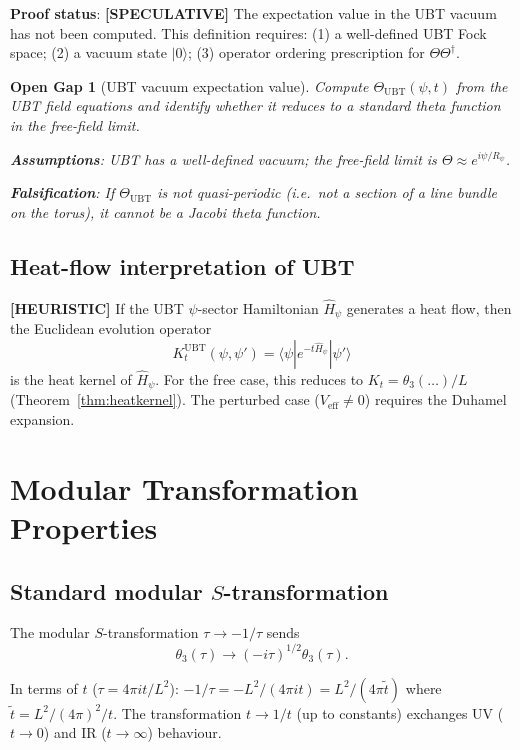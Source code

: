 \documentclass[11pt,a4paper]{article}
\newtheorem{gap}{Open Gap}
\newcommand{\heuristic}[1]{\textbf{[HEURISTIC]} #1}
\newcommand{\speculative}[1]{\textbf{[SPECULATIVE]} #1}
\begin{document}
\textbf{Proof status}: \speculative{The expectation value in the UBT vacuum
has not been computed.  This definition requires:
(1) a well-defined UBT Fock space;
(2) a vacuum state $|0\rangle$;
(3) operator ordering prescription for $\Theta\Theta^\dagger$.}

\begin{gap}[UBT vacuum expectation value]
  \label{gap:vev}
  Compute $\Theta_\mathrm{UBT}(\psi, t)$ from the UBT field equations and
  identify whether it reduces to a standard theta function in the free-field limit.

  \textbf{Assumptions}: UBT has a well-defined vacuum; the free-field limit
  is $\Theta \approx e^{i\psi/R_\psi}$.

  \textbf{Falsification}: If $\Theta_\mathrm{UBT}$ is not quasi-periodic
  (i.e.\ not a section of a line bundle on the torus), it cannot be a
  Jacobi theta function.
\end{gap}

\subsection{Heat-flow interpretation of UBT}

\heuristic{If the UBT $\psi$-sector Hamiltonian $\hat{H}_\psi$ generates
a heat flow, then the Euclidean evolution operator
\[
  K_t^\mathrm{UBT}(\psi, \psi') = \langle\psi|e^{-t\hat{H}_\psi}|\psi'\rangle
\]
is the heat kernel of $\hat{H}_\psi$.  For the free case, this reduces to
$K_t = \theta_3(\ldots)/L$ (Theorem~\ref{thm:heatkernel}).  The perturbed
case ($V_\mathrm{eff} \neq 0$) requires the Duhamel expansion.}

\section{Modular Transformation Properties}

\subsection{Standard modular $S$-transformation}

The modular $S$-transformation $\tau \to -1/\tau$ sends
\[
  \theta_3(\tau) \to (-i\tau)^{1/2}\theta_3(\tau).
\]

In terms of $t$ ($\tau = 4\pi it/L^2$): $-1/\tau = -L^2/(4\pi it) = L^2/(4\pi \tilde{t})$
where $\tilde{t} = L^2/(4\pi)^2/t$.  The transformation $t \to 1/t$ (up to constants)
exchanges UV ($t \to 0$) and IR ($t \to \infty$) behaviour.
\end{document}
